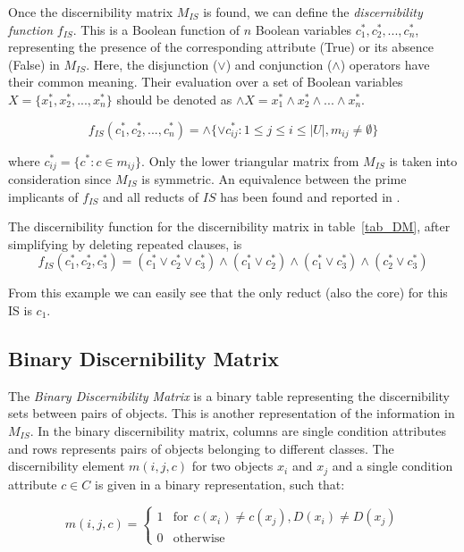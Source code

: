 \documentclass[authoryear,11pt]{elsarticle}
\begin{document}
  Once the discernibility matrix $M_{IS}$ is found, we can define the \textit{discernibility function} $f_{IS}$.
  This is a Boolean function of $n$ Boolean variables $c_1^*, c_2^*,...,c_n^*$, representing the presence of
  the corresponding attribute (True) or its absence (False) in $M_{IS}$. Here, the disjunction ($\vee$) and 
  conjunction ($\wedge$) operators have their common meaning. Their evaluation over a set of Boolean variables
  $X=\lbrace x_1^*, x_2^*, ..., x_n^* \rbrace$ should be denoted as 
  $\wedge X= x_1^* \wedge x_2^* \wedge ... \wedge x_n^* $.

  \begin{equation}
  	f_{IS}(c_1^*, c_2^*,...,c_n^*)=\wedge \lbrace \vee c_{ij}^* : 1 \leq j \leq i \leq |U|, 
  									m_{ij} \neq \emptyset \rbrace
  \end{equation}

  where $c_{ij}^*=\lbrace c^* : c \in m_{ij} \rbrace$. Only the lower triangular matrix from $M_{IS}$ is
  taken into consideration since $M_{IS}$ is symmetric. An equivalence between the prime implicants of
  $f_{IS}$ and all reducts of $IS$ has been found and reported in \citep{Pawlak07}.
  
  The discernibility function for the discernibility matrix in table~\ref{tab_DM}, after simplifying by 
  deleting repeated clauses, is  
  $$f_{IS}(c_1^*,c_2^*,c_3^*)=(c_1^* \vee c_2^* \vee c_3^*) \wedge (c_1^* \vee c_2^*) 
   \wedge (c_1^* \vee c_3^*) \wedge (c_2^* \vee c_3^*) $$
  
  From this example we can easily see that the only reduct (also the core) for this IS is $c_1$.
  
\subsection{Binary Discernibility Matrix}
  The \textit{Binary Discernibility Matrix} is a binary table representing the discernibility sets between pairs 
  of objects. This is another representation of the information in $M_{IS}$. In the binary discernibility
  matrix, columns are single condition attributes and rows represents pairs of objects belonging to different 
  classes. The discernibility element $m(i, j, c)$ for two objects $x_i$ and $x_j$ and a single condition 
  attribute $c \in C$ is given in a binary representation, such that:
  
  \begin{equation}
  	m(i, j, c)=\left\lbrace\begin{array}{cl}
  			1 & \mathrm{for~~}c(x_i) \neq c(x_j),D(x_i) \neq D(x_j)\\
  			0 								   & \mathrm{otherwise} 
  	\end{array}\right.
  \end{equation} 
  
\end{document}
